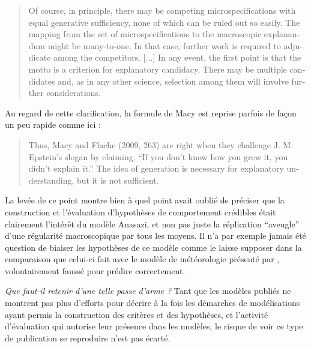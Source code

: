 \foreignblockquote{english}[\cite{Epstein2006}]{Of course, in principle, there may be competing microspecifications with equal generative sufficiency, none of which can be ruled out so easily. The mapping from the set of microspecifications to the macroscopic explanandum might be many-to-one. In that case, further work is required to adjudicate among the competitors. [...] In any event, the first point is that the motto is a criterion for explanatory candidacy. There may be multiple candidates and, as in any other science, selection among them will involve further considerations.}

Au regard de cette clarification, la formule de Macy est reprise parfois de façon un peu rapide comme ici :

\foreignblockquote{english}[\cite{Marchionni2013}]{Thus, Macy and Flache (2009, 263) are right when they challenge J. M. Epstein’s slogan by claiming, \enquote{If you don’t know how you grew it, you didn’t explain it.} The idea of generation is necessary for explanatory understanding, but it is not sufficient.}

La levée de ce point montre bien à quel point \textcite{Yanoff2008} avait oublié de préciser que la construction et l'évaluation d'hypothèses de comportement crédibles était clairement l'intérêt du modèle Anasazi, et non pas juste la réplication \enquote{aveugle} d'une régularité macroscopique par tous les moyens. Il n'a par exemple jamais été question de biaiser les hypothèses de ce modèle comme le laisse supposer \textcite{Yanoff2008} dans la comparaison que celui-ci fait avec le modèle de météorologie présenté par \textcite{Kuppers2005}, volontairement faussé pour prédire correctement.

\textit{Que faut-il retenir d'une telle passe d'arme ?} Tant que les modèles publiés ne montrent pas plus d'efforts pour décrire à la fois les démarches de modélisations ayant permis la construction des critères et des hypothèses, et l'activité d'évaluation qui autorise leur présence dans les modèles, le risque de voir ce type de publication se reproduire n'est pas écarté.

